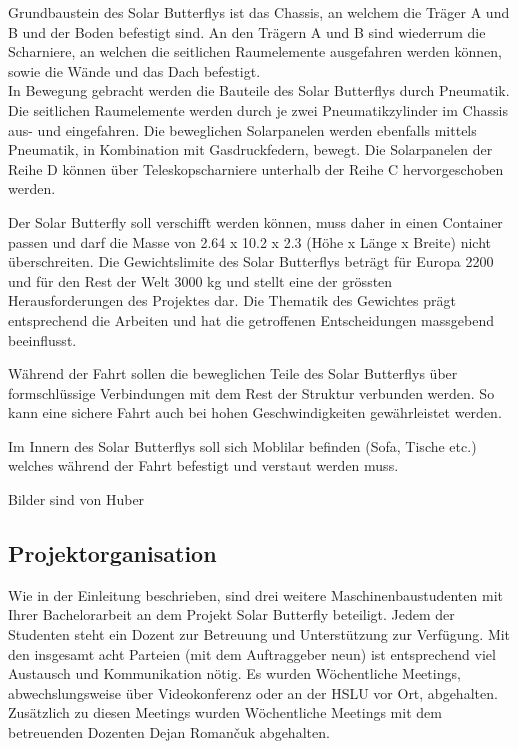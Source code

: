 Grundbaustein des Solar Butterflys ist das Chassis, an welchem die Träger A und B und der Boden befestigt sind. An den Trägern A und B sind wiederrum die Scharniere, an welchen die seitlichen Raumelemente ausgefahren werden können, sowie die Wände und das Dach befestigt.\\
In Bewegung gebracht werden die Bauteile des Solar Butterflys durch Pneumatik. Die seitlichen Raumelemente werden durch je zwei Pneumatikzylinder im Chassis aus- und eingefahren. Die beweglichen Solarpanelen werden ebenfalls mittels Pneumatik, in Kombination mit Gasdruckfedern, bewegt. Die Solarpanelen der Reihe D können über Teleskopscharniere unterhalb der Reihe C hervorgeschoben werden.

Der Solar Butterfly soll verschifft werden können, muss daher in einen Container passen und darf die Masse von 2.64 x 10.2 x 2.3 (Höhe x Länge x Breite) nicht überschreiten. Die Gewichtslimite des Solar Butterflys beträgt für Europa 2200 und für den Rest der Welt 3000 kg und stellt eine der grössten Herausforderungen des Projektes dar. Die Thematik des Gewichtes prägt entsprechend die Arbeiten und hat die getroffenen Entscheidungen massgebend beeinflusst.

Während der Fahrt sollen die beweglichen Teile des Solar Butterflys über formschlüssige Verbindungen mit dem Rest der Struktur verbunden werden. So kann eine sichere Fahrt auch bei hohen Geschwindigkeiten gewährleistet werden.

Im Innern des Solar Butterflys soll sich Moblilar befinden (Sofa, Tische etc.) welches während der Fahrt befestigt und verstaut werden muss.

Bilder sind von Huber
\subsection{Projektorganisation}
Wie in der Einleitung beschrieben, sind drei weitere Maschinenbaustudenten mit Ihrer Bachelorarbeit an dem Projekt Solar Butterfly beteiligt. Jedem der Studenten steht ein Dozent zur Betreuung und Unterstützung zur Verfügung. Mit den insgesamt acht Parteien (mit dem Auftraggeber neun) ist entsprechend viel Austausch und Kommunikation nötig. Es wurden Wöchentliche Meetings, abwechslungsweise über Videokonferenz oder an der HSLU vor Ort, abgehalten. Zusätzlich zu diesen Meetings wurden Wöchentliche Meetings mit dem betreuenden Dozenten Dejan Roman\v{c}uk abgehalten.
\newpage

